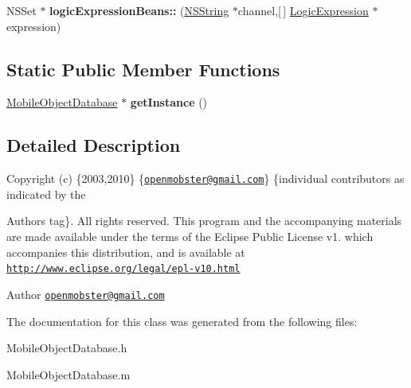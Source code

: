 \begin{DoxyCompactItemize}
\item 
\hypertarget{interface_mobile_object_database_abcac5c4b6d52a4652dc0cb34f2e9db15}{
\-N\-S\-Set $\ast$ {\bfseries logic\-Expression\-Beans\-::} (\hyperlink{class_n_s_string}{\-N\-S\-String} $\ast$channel,\mbox{[}$\,$\mbox{]} \hyperlink{interface_logic_expression}{\-Logic\-Expression} $\ast$expression)}
\label{interface_mobile_object_database_abcac5c4b6d52a4652dc0cb34f2e9db15}

\end{DoxyCompactItemize}
\subsection*{\-Static \-Public \-Member \-Functions}
\begin{DoxyCompactItemize}
\item 
\hypertarget{interface_mobile_object_database_a036cb43860fccda307c79ed4b1ec73dc}{
\hyperlink{interface_mobile_object_database}{\-Mobile\-Object\-Database} $\ast$ {\bfseries get\-Instance} ()}
\label{interface_mobile_object_database_a036cb43860fccda307c79ed4b1ec73dc}

\end{DoxyCompactItemize}


\subsection{\-Detailed \-Description}
\-Copyright (c) \{2003,2010\} \{\href{mailto:openmobster@gmail.com}{\tt openmobster@gmail.\-com}\} \{individual contributors as indicated by the \begin{DoxyAuthor}{\-Authors}
tag\}. \-All rights reserved. \-This program and the accompanying materials are made available under the terms of the \-Eclipse \-Public \-License v1. which accompanies this distribution, and is available at \href{http://www.eclipse.org/legal/epl-v10.html}{\tt http\-://www.\-eclipse.\-org/legal/epl-\/v10.\-html}
\end{DoxyAuthor}
\begin{DoxyAuthor}{\-Author}
\href{mailto:openmobster@gmail.com}{\tt openmobster@gmail.\-com} 
\end{DoxyAuthor}


\-The documentation for this class was generated from the following files\-:\begin{DoxyCompactItemize}
\item 
\-Mobile\-Object\-Database.\-h\item 
\-Mobile\-Object\-Database.\-m\end{DoxyCompactItemize}
